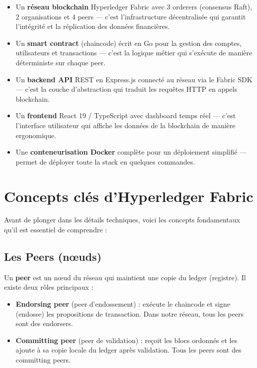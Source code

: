\documentclass[12pt,a4paper,twoside]{report}
\begin{document}
\begin{itemize}[leftmargin=2cm]
    \item[\faLink] Un \textbf{réseau blockchain} Hyperledger Fabric avec 3 orderers (consensus Raft), 2 organisations et 4 peers --- c'est l'infrastructure décentralisée qui garantit l'intégrité et la réplication des données financières.
    \item[\faFileCode] Un \textbf{smart contract} (chaincode) écrit en Go pour la gestion des comptes, utilisateurs et transactions --- c'est la logique métier qui s'exécute de manière déterministe sur chaque peer.
    \item[\faServer] Un \textbf{backend API} REST en Express.js connecté au réseau via le Fabric SDK --- c'est la couche d'abstraction qui traduit les requêtes HTTP en appels blockchain.
    \item[\faDesktop] Un \textbf{frontend} React 19 / TypeScript avec dashboard temps réel --- c'est l'interface utilisateur qui affiche les données de la blockchain de manière ergonomique.
    \item[\faDocker] Une \textbf{conteneurisation Docker} complète pour un déploiement simplifié --- permet de déployer toute la stack en quelques commandes.
\end{itemize}

\section{Concepts clés d'Hyperledger Fabric}

Avant de plonger dans les détails techniques, voici les concepts fondamentaux qu'il est essentiel de comprendre :

\subsection{Les Peers (nœuds)}

Un \textbf{peer} est un nœud du réseau qui maintient une copie du ledger (registre). Il existe deux rôles principaux :

\begin{itemize}
    \item \textbf{Endorsing peer} (peer d'endossement) : exécute le chaincode et signe (endosse) les propositions de transaction. Dans notre réseau, tous les peers sont des endorsers.
    \item \textbf{Committing peer} (peer de validation) : reçoit les blocs ordonnés et les ajoute à sa copie locale du ledger après validation. Tous les peers sont des committing peers.
\end{itemize}
\end{document}
